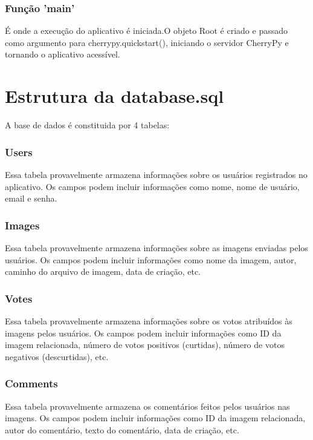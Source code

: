 \documentclass{report}
\begin{document}
\subsubsection{Função 'main'}

\indent É onde a execução do aplicativo é iniciada.O objeto Root é criado e passado como argumento para cherrypy.quickstart(), iniciando o servidor CherryPy e tornando o aplicativo acessível.

\section {Estrutura da database.sql}

\indent A base de dados é constituida por 4 tabelas:

\subsubsection{Users}

\indent Essa tabela provavelmente armazena informações sobre os usuários registrados no aplicativo.
Os campos podem incluir informações como nome, nome de usuário, email e senha.\\

\subsubsection{Images}

\indent Essa tabela provavelmente armazena informações sobre as imagens enviadas pelos usuários.
Os campos podem incluir informações como nome da imagem, autor, caminho do arquivo de imagem, data de criação, etc.\\

\subsubsection{Votes}

\indent Essa tabela provavelmente armazena informações sobre os votos atribuídos às imagens pelos usuários.
Os campos podem incluir informações como ID da imagem relacionada, número de votos positivos (curtidas), número de votos negativos (descurtidas), etc.\\

\subsubsection{Comments}

\indent Essa tabela provavelmente armazena os comentários feitos pelos usuários nas imagens.
Os campos podem incluir informações como ID da imagem relacionada, autor do comentário, texto do comentário, data de criação, etc.\\
\end{document}
